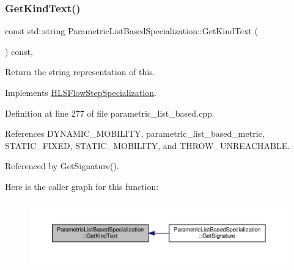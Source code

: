 \subsubsection{\texorpdfstring{Get\+Kind\+Text()}{GetKindText()}}
{\footnotesize\ttfamily const std\+::string Parametric\+List\+Based\+Specialization\+::\+Get\+Kind\+Text (\begin{DoxyParamCaption}{ }\end{DoxyParamCaption}) const\hspace{0.3cm}{\ttfamily [override]}, {\ttfamily [virtual]}}



Return the string representation of this. 



Implements \hyperlink{classHLSFlowStepSpecialization_abcad0108fa726ac69986e26671a75ec3}{H\+L\+S\+Flow\+Step\+Specialization}.



Definition at line 277 of file parametric\+\_\+list\+\_\+based.\+cpp.



References D\+Y\+N\+A\+M\+I\+C\+\_\+\+M\+O\+B\+I\+L\+I\+TY, parametric\+\_\+list\+\_\+based\+\_\+metric, S\+T\+A\+T\+I\+C\+\_\+\+F\+I\+X\+ED, S\+T\+A\+T\+I\+C\+\_\+\+M\+O\+B\+I\+L\+I\+TY, and T\+H\+R\+O\+W\+\_\+\+U\+N\+R\+E\+A\+C\+H\+A\+B\+LE.



Referenced by Get\+Signature().

Here is the caller graph for this function\+:
\nopagebreak
\begin{figure}[H]
\begin{center}
\leavevmode
\includegraphics[width=350pt]{de/d49/classParametricListBasedSpecialization_a713bf4dc25984627ab7e0803f91510c2_icgraph}
\end{center}
\end{figure}
\mbox{\label{classParametricListBasedSpecialization_ab4a9c8147842a19814c43444a8d502d6}} 
